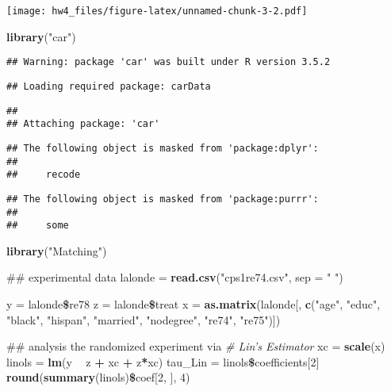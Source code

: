 \documentclass[]{article}
\newenvironment{Shaded}{\begin{snugshade}}{\end{snugshade}}
\newcommand{\KeywordTok}[1]{\textcolor[rgb]{0.13,0.29,0.53}{\textbf{#1}}}
\newcommand{\DataTypeTok}[1]{\textcolor[rgb]{0.13,0.29,0.53}{#1}}
\newcommand{\DecValTok}[1]{\textcolor[rgb]{0.00,0.00,0.81}{#1}}
\newcommand{\StringTok}[1]{\textcolor[rgb]{0.31,0.60,0.02}{#1}}
\newcommand{\CommentTok}[1]{\textcolor[rgb]{0.56,0.35,0.01}{\textit{#1}}}
\newcommand{\OperatorTok}[1]{\textcolor[rgb]{0.81,0.36,0.00}{\textbf{#1}}}
\newcommand{\NormalTok}[1]{#1}
\begin{document}
\texttt{[image: hw4\_files/figure-latex/unnamed-chunk-3-2.pdf]}

\begin{Shaded}
\begin{Highlighting}[]
\KeywordTok{library}\NormalTok{(}\StringTok{"car"}\NormalTok{)}
\end{Highlighting}
\end{Shaded}

\begin{verbatim}
## Warning: package 'car' was built under R version 3.5.2
\end{verbatim}

\begin{verbatim}
## Loading required package: carData
\end{verbatim}

\begin{verbatim}
## 
## Attaching package: 'car'
\end{verbatim}

\begin{verbatim}
## The following object is masked from 'package:dplyr':
## 
##     recode
\end{verbatim}

\begin{verbatim}
## The following object is masked from 'package:purrr':
## 
##     some
\end{verbatim}

\begin{Shaded}
\begin{Highlighting}[]
\KeywordTok{library}\NormalTok{(}\StringTok{"Matching"}\NormalTok{)}

\NormalTok{## experimental data}
\NormalTok{lalonde =}\StringTok{ }\KeywordTok{read.csv}\NormalTok{(}\StringTok{"cps1re74.csv"}\NormalTok{, }\DataTypeTok{sep =} \StringTok{" "}\NormalTok{)}

\NormalTok{y =}\StringTok{ }\NormalTok{lalonde}\OperatorTok{\$}\NormalTok{re78}
\NormalTok{z =}\StringTok{ }\NormalTok{lalonde}\OperatorTok{\$}\NormalTok{treat}
\NormalTok{x =}\StringTok{ }\KeywordTok{as.matrix}\NormalTok{(lalonde[, }\KeywordTok{c}\NormalTok{(}\StringTok{"age"}\NormalTok{, }\StringTok{"educ"}\NormalTok{, }\StringTok{"black"}\NormalTok{,}
                          \StringTok{"hispan"}\NormalTok{, }\StringTok{"married"}\NormalTok{, }\StringTok{"nodegree"}\NormalTok{,}
                          \StringTok{"re74"}\NormalTok{, }\StringTok{"re75"}\NormalTok{)])}

\NormalTok{## analysis the randomized experiment via}
\CommentTok{# Lin's Estimator}
\NormalTok{xc =}\StringTok{ }\KeywordTok{scale}\NormalTok{(x)}
\NormalTok{linols =}\StringTok{ }\KeywordTok{lm}\NormalTok{(y }\OperatorTok{~}\StringTok{ }\NormalTok{z }\OperatorTok{+}\StringTok{ }\NormalTok{xc }\OperatorTok{+}\StringTok{ }\NormalTok{z}\OperatorTok{*}\NormalTok{xc)}
\NormalTok{tau_Lin =}\StringTok{ }\NormalTok{linols}\OperatorTok{\$}\NormalTok{coefficients[}\DecValTok{2}\NormalTok{]}
\KeywordTok{round}\NormalTok{(}\KeywordTok{summary}\NormalTok{(linols)}\OperatorTok{\$}\NormalTok{coef[}\DecValTok{2}\NormalTok{, ], }\DecValTok{4}\NormalTok{)}
\end{Highlighting}
\end{Shaded}
\end{document}
